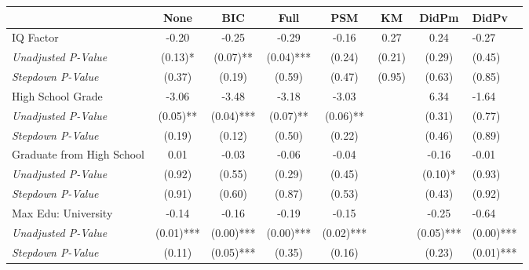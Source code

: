 \begin{tabular}{l c c c c c c}
\toprule
 & None & BIC & Full & PSM & KM & DidPm & DidPv \\
\midrule
IQ Factor & -0.20 & -0.25 & -0.29 & -0.16 & 0.27 & 0.24 & -0.27 \\
\quad \textit{Unadjusted P-Value} & (0.13)* & (0.07)** & (0.04)*** & (0.24) & (0.21) & (0.29) & (0.45) \\
\quad \textit{Stepdown P-Value} & (0.37) & (0.19) & (0.59) & (0.47) & (0.95) & (0.63) & (0.85) \\
High School Grade & -3.06 & -3.48 & -3.18 & -3.03 & & 6.34 & -1.64 \\
\quad \textit{Unadjusted P-Value} & (0.05)** & (0.04)*** & (0.07)** & (0.06)** & & (0.31) & (0.77) \\
\quad \textit{Stepdown P-Value} & (0.19) & (0.12) & (0.50) & (0.22) & & (0.46) & (0.89) \\
Graduate from High School & 0.01 & -0.03 & -0.06 & -0.04 & & -0.16 & -0.01 \\
\quad \textit{Unadjusted P-Value} & (0.92) & (0.55) & (0.29) & (0.45) & & (0.10)* & (0.93) \\
\quad \textit{Stepdown P-Value} & (0.91) & (0.60) & (0.87) & (0.53) & & (0.43) & (0.92) \\
Max Edu: University & -0.14 & -0.16 & -0.19 & -0.15 & & -0.25 & -0.64 \\
\quad \textit{Unadjusted P-Value} & (0.01)*** & (0.00)*** & (0.00)*** & (0.02)*** & & (0.05)*** & (0.00)*** \\
\quad \textit{Stepdown P-Value} & (0.11) & (0.05)*** & (0.35) & (0.16) & & (0.23) & (0.01)*** \\
\bottomrule
\end{tabular}
